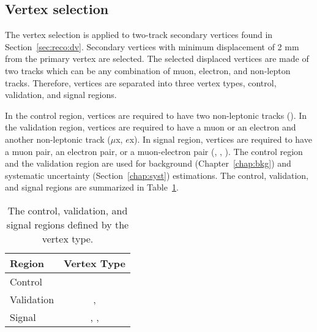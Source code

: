\subsection{Vertex selection}
\label{sec:vertex_selection}
The vertex selection is applied to two-track secondary vertices found in Section~\ref{sec:reco:dv}. Secondary vertices with minimum displacement of 2 mm from the primary vertex are selected. The selected displaced vertices are made of two tracks which can be any combination of muon, electron, and non-lepton tracks. Therefore, vertices are separated into three vertex types, control, validation, and signal regions.

In the control region, vertices are required to have two non-leptonic tracks (\xx). In the validation region, vertices are required to have a muon or an electron and another non-leptonic track ($\mu$x, $e$x). In signal region, vertices are required to have a muon pair, an electron pair, or a muon-electron pair (\mumu, \ee, \emu). The control region and the validation region are used for background (Chapter~\ref{chap:bkg}) and systematic uncertainty (Section~\ref{chap:syst}) estimations. The control, validation, and signal regions are summarized in Table~\ref{table:vertex_type}.

\begin{table}[!h]
  \centering
  \begin{tabular}{ l  c}
    \hline
    \hline
	Region				& Vertex Type										\\
    \hline
	Control     		& \xx   										\\
	Validation       	& \mux, \ex										\\
	Signal       		& \mumu, \ee, \emu							\\
    \hline
    \hline
  \end{tabular}
  \caption{The control, validation, and signal regions defined by the vertex type.}
  \label{table:vertex_type}
\end{table}

